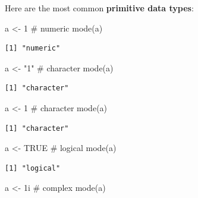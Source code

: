 \documentclass[
  letterpaper,
  DIV=11,
  numbers=noendperiod]{scrartcl}
\newenvironment{Shaded}{\begin{snugshade}}{\end{snugshade}}
\newcommand{\CommentTok}[1]{\textcolor[rgb]{0.37,0.37,0.37}{#1}}
\newcommand{\ConstantTok}[1]{\textcolor[rgb]{0.56,0.35,0.01}{#1}}
\newcommand{\DecValTok}[1]{\textcolor[rgb]{0.68,0.00,0.00}{#1}}
\newcommand{\FunctionTok}[1]{\textcolor[rgb]{0.28,0.35,0.67}{#1}}
\newcommand{\NormalTok}[1]{\textcolor[rgb]{0.00,0.23,0.31}{#1}}
\newcommand{\OtherTok}[1]{\textcolor[rgb]{0.00,0.23,0.31}{#1}}
\newcommand{\StringTok}[1]{\textcolor[rgb]{0.13,0.47,0.30}{#1}}
\begin{document}
Here are the most common \textbf{primitive data types}:

\begin{Shaded}
\begin{Highlighting}[]
\NormalTok{a }\OtherTok{\textless{}{-}} \DecValTok{1}    \CommentTok{\# numeric}
\FunctionTok{mode}\NormalTok{(a)}
\end{Highlighting}
\end{Shaded}

\begin{verbatim}
[1] "numeric"
\end{verbatim}

\begin{Shaded}
\begin{Highlighting}[]
\NormalTok{a }\OtherTok{\textless{}{-}} \StringTok{"1"}  \CommentTok{\# character}
\FunctionTok{mode}\NormalTok{(a)}
\end{Highlighting}
\end{Shaded}

\begin{verbatim}
[1] "character"
\end{verbatim}

\begin{Shaded}
\begin{Highlighting}[]
\NormalTok{a }\OtherTok{\textless{}{-}} \StringTok{\textquotesingle{}1\textquotesingle{}}  \CommentTok{\# character}
\FunctionTok{mode}\NormalTok{(a)}
\end{Highlighting}
\end{Shaded}

\begin{verbatim}
[1] "character"
\end{verbatim}

\begin{Shaded}
\begin{Highlighting}[]
\NormalTok{a }\OtherTok{\textless{}{-}} \ConstantTok{TRUE} \CommentTok{\# logical}
\FunctionTok{mode}\NormalTok{(a)}
\end{Highlighting}
\end{Shaded}

\begin{verbatim}
[1] "logical"
\end{verbatim}

\begin{Shaded}
\begin{Highlighting}[]
\NormalTok{a }\OtherTok{\textless{}{-}}  \DecValTok{1}\NormalTok{i  }\CommentTok{\# complex}
\FunctionTok{mode}\NormalTok{(a)}
\end{Highlighting}
\end{Shaded}
\end{document}
